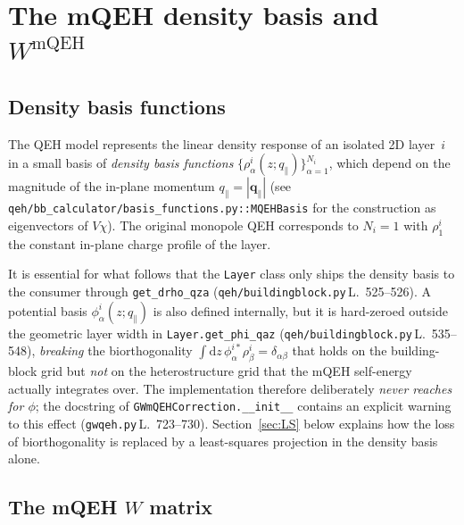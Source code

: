 \documentclass[11pt,a4paper]{article}
\newcommand{\qpar}{\mathbf{q}_{\parallel}}
\newcommand{\dd}{\mathrm{d}}
\begin{document}
\section{The mQEH density basis and \texorpdfstring{$W^{\text{mQEH}}$}{W\_mQEH}}

\subsection{Density basis functions}

The QEH model represents the linear density response of an isolated
2D layer~$i$ in a small basis of \emph{density basis functions}
$\{\rho^{i}_{\alpha}(z;q_\parallel)\}_{\alpha=1}^{N_i}$, which depend
on the magnitude of the in-plane momentum
$q_\parallel = |\qpar|$ (see
\texttt{qeh/bb\_calculator/basis\_functions.py::MQEHBasis} for the
construction as eigenvectors of $V\chi$).  The original monopole QEH
corresponds to $N_i=1$ with $\rho^{i}_{1}$ the constant in-plane
charge profile of the layer.

It is essential for what follows that the \texttt{Layer} class only
ships the density basis to the consumer through
\texttt{get\_drho\_qza} (\texttt{qeh/buildingblock.py}\,L.~525--526).
A potential basis $\phi^{i}_{\alpha}(z;q_\parallel)$ is also defined
internally, but it is hard-zeroed outside the geometric layer width
in \texttt{Layer.get\_phi\_qaz} (\texttt{qeh/buildingblock.py}\,L.~535--548),
\emph{breaking} the biorthogonality
$\int\dd z\,\phi^{i*}_{\alpha}\rho^{i}_{\beta}=\delta_{\alpha\beta}$
that holds on the building-block grid but \emph{not} on the
heterostructure grid that the mQEH self-energy actually integrates
over.  The implementation therefore deliberately \emph{never reaches
for $\phi$}; the docstring of \texttt{GWmQEHCorrection.\_\_init\_\_}
contains an explicit warning to this effect
(\texttt{gwqeh.py}\,L.~723--730).  Section~\ref{sec:LS} below explains
how the loss of biorthogonality is replaced by a least-squares
projection in the density basis alone.

\subsection{The mQEH $W$ matrix}
\end{document}
